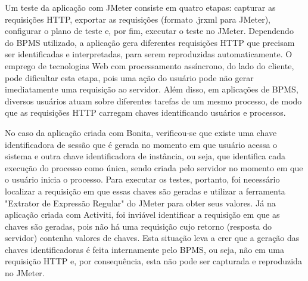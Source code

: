 \documentclass[12pt]{article}
\begin{document}
Um teste da aplicação com JMeter consiste em quatro etapas: capturar as requisições HTTP, exportar as requisições (formato .jrxml para JMeter), configurar o plano de teste e, por fim, executar o teste no JMeter. Dependendo do BPMS utilizado, a aplicação gera diferentes requisições HTTP que precisam ser identificadas e interpretadas, para serem reproduzidas automaticamente. O emprego de tecnologias Web com processamento assíncrono, do lado do cliente, pode dificultar esta etapa, pois uma ação do usuário pode não gerar imediatamente uma requisição ao servidor. Além disso, em aplicações de BPMS, diversos usuários atuam sobre diferentes tarefas de um mesmo processo, de modo que as requisições HTTP carregam chaves identificando usuários e processos.


No caso da aplicação criada com Bonita, verificou-se que existe uma chave identificadora de sessão que é gerada no momento em que usuário acessa o sistema e outra chave identificadora de instância, ou seja, que identifica cada execução do processo como única, sendo criada pelo servidor no momento em que o usuário inicia o processo. Para executar os testes, portanto, foi necessário localizar a requisição em que essas chaves são geradas e utilizar a ferramenta "Extrator de Expressão Regular" do JMeter para obter seus valores. Já na aplicação criada com Activiti, foi inviável identificar a requisição em que as chaves são geradas, pois não há uma requisição cujo retorno (resposta do servidor) contenha valores de chaves. Esta situação leva a crer que a geração das chaves identificadoras é feita internamente pelo BPMS, ou seja, não em uma requisição HTTP e, por consequência, esta não pode ser capturada e reproduzida no JMeter.

\end{document}
